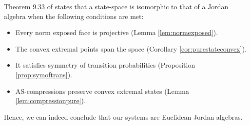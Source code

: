 \documentclass[b5paper,onecolumn,12pt,accepted=2019-05-03, issue=1, volume=1, shorttitle=papers/compositionality-1-1]{compositionalityarticle}
\newcounter{counter}
\numberwithin{counter}{section}
\newtheorem{proposition}[counter]{Proposition}
\newcommand{\asrt}{\text{asrt}}
\newcommand{\im}[1]{\text{im}(#1)}
\begin{document}
Theorem 9.33 of \cite{alfsen2012geometry} states that a state-space is isomorphic to that of a Jordan algebra when the following conditions are met:
\begin{itemize}
    \item Every norm exposed face is projective (Lemma \ref{lem:normexposed}).
    \item The convex extremal points span the space (Corollary \ref{cor:purestateconvex}).
    \item It satisfies symmetry of transition probabilities (Proposition \ref{prop:symoftrans}).
    \item AS-compressions preserve convex extremal states (Lemma \ref{lem:compressionpure}).
\end{itemize}

Hence, we can indeed conclude that our systems are Euclidean Jordan algebras.




\end{document}
